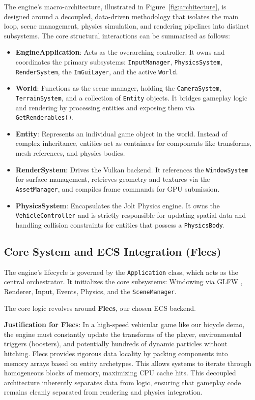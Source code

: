 \documentclass[acmtog, nonacm]{acmart}
\begin{document}
The engine's macro-architecture, illustrated in Figure~\ref{fig:architecture}, is designed around a decoupled, data-driven methodology that isolates the main loop, scene management, physics simulation, and rendering pipelines into distinct subsystems. The core structural interactions can be summarised as follows:

\begin{itemize}
    \item \textbf{EngineApplication}: Acts as the overarching controller. It owns and coordinates the primary subsystems: \texttt{InputManager}, \texttt{PhysicsSystem}, \texttt{RenderSystem}, the \texttt{ImGuiLayer}, and the active \texttt{World}.
    \item \textbf{World}: Functions as the scene manager, holding the \texttt{CameraSystem}, \texttt{TerrainSystem}, and a collection of \texttt{Entity} objects. It bridges gameplay logic and rendering by processing entities and exposing them via \texttt{GetRenderables()}.
    \item \textbf{Entity}: Represents an individual game object in the world. Instead of complex inheritance, entities act as containers for components like transforms, mesh references, and physics bodies.
    \item \textbf{RenderSystem}: Drives the Vulkan backend. It references the \texttt{WindowSystem} for surface management, retrieves geometry and textures via the \texttt{AssetManager}, and compiles frame commands for GPU submission.
    \item \textbf{PhysicsSystem}: Encapsulates the Jolt Physics engine. It owns the \texttt{VehicleController} and is strictly responsible for updating spatial data and handling collision constraints for entities that possess a \texttt{PhysicsBody}.
\end{itemize}

\subsection{Core System and ECS Integration (Flecs)}
The engine's lifecycle is governed by the \texttt{Application} class, which acts as the central orchestrator. It initializes the core subsystems: Windowing via GLFW \cite{GLFW}, Renderer, Input, Events, Physics, and the \texttt{SceneManager}.

The core logic revolves around \textbf{Flecs}, our chosen ECS backend. 

\textbf{Justification for Flecs}: In a high-speed vehicular game like our bicycle demo, the engine must constantly update the transforms of the player, environmental triggers (boosters), and potentially hundreds of dynamic particles without hitching. Flecs provides rigorous data locality by packing components into memory arrays based on entity archetypes. This allows systems to iterate through homogeneous blocks of memory, maximizing CPU cache hits. This decoupled architecture inherently separates data from logic, ensuring that gameplay code remains cleanly separated from rendering and physics integration.
\end{document}
